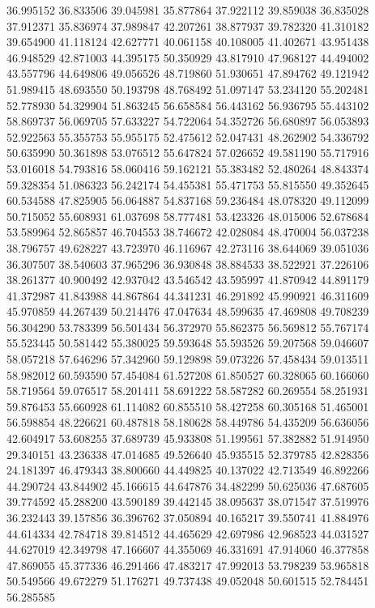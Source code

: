 36.995152
36.833506
39.045981
35.877864
37.922112
39.859038
36.835028
37.912371
35.836974
37.989847
42.207261
38.877937
39.782320
41.310182
39.654900
41.118124
42.627771
40.061158
40.108005
41.402671
43.951438
46.948529
42.871003
44.395175
50.350929
43.817910
47.968127
44.494002
43.557796
44.649806
49.056526
48.719860
51.930651
47.894762
49.121942
51.989415
48.693550
50.193798
48.768492
51.097147
53.234120
55.202481
52.778930
54.329904
51.863245
56.658584
56.443162
56.936795
55.443102
58.869737
56.069705
57.633227
54.722064
54.352726
56.680897
56.053893
52.922563
55.355753
55.955175
52.475612
52.047431
48.262902
54.336792
50.635990
50.361898
53.076512
55.647824
57.026652
49.581190
55.717916
53.016018
54.793816
58.060416
59.162121
55.383482
52.480264
48.843374
59.328354
51.086323
56.242174
54.455381
55.471753
55.815550
49.352645
60.534588
47.825905
56.064887
54.837168
59.236484
48.078320
49.112099
50.715052
55.608931
61.037698
58.777481
53.423326
48.015006
52.678684
53.589964
52.865857
46.704553
38.746672
42.028084
48.470004
56.037238
38.796757
49.628227
43.723970
46.116967
42.273116
38.644069
39.051036
36.307507
38.540603
37.965296
36.930848
38.884533
38.522921
37.226106
38.261377
40.900492
42.937042
43.546542
43.595997
41.870942
44.891179
41.372987
41.843988
44.867864
44.341231
46.291892
45.990921
46.311609
45.970859
44.267439
50.214476
47.047634
48.599635
47.469808
49.708239
56.304290
53.783399
56.501434
56.372970
55.862375
56.569812
55.767174
55.523445
50.581442
55.380025
59.593648
55.593526
59.207568
59.046607
58.057218
57.646296
57.342960
59.129898
59.073226
57.458434
59.013511
58.982012
60.593590
57.454084
61.527208
61.850527
60.328065
60.166060
58.719564
59.076517
58.201411
58.691222
58.587282
60.269554
58.251931
59.876453
55.660928
61.114082
60.855510
58.427258
60.305168
51.465001
56.598854
48.226621
60.487818
58.180628
58.449786
54.435209
56.636056
42.604917
53.608255
37.689739
45.933808
51.199561
57.382882
51.914950
29.340151
43.236338
47.014685
49.526640
45.935515
52.379785
42.828356
24.181397
46.479343
38.800660
44.449825
40.137022
42.713549
46.892266
44.290724
43.844902
45.166615
44.647876
34.482299
50.625036
47.687605
39.774592
45.288200
43.590189
39.442145
38.095637
38.071547
37.519976
36.232443
39.157856
36.396762
37.050894
40.165217
39.550741
41.884976
44.614334
42.784718
39.814512
44.465629
42.697986
42.968523
44.031527
44.627019
42.349798
47.166607
44.355069
46.331691
47.914060
46.377858
47.869055
45.377336
46.291466
47.483217
47.992013
53.798239
53.965818
50.549566
49.672279
51.176271
49.737438
49.052048
50.601515
52.784451
56.285585
